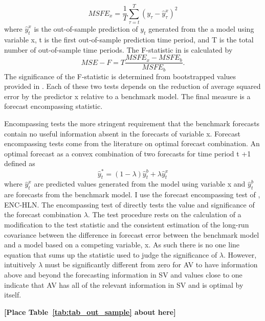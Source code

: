 \begin{equation} \label{eq:msfe}
	MSFE_{x} = \frac{1}{T} \sum_{\tau=t}^{T} (y_{\tau} - \hat{y}^{x}_{\tau})^{2}
\end{equation}
where $\hat{y}^{x}_{t}$ is the out-of-sample prediction of $y_{t}$ generated from the a model using variable x, t is the first out-of-sample prediction time period, and T is the total number of out-of-sample time periods. The F-statistic in \citet{mccracken_asymptotics_2007} is calculated by
\begin{equation} \label{eq:mse-f}
MSE-F = T \frac{MSFE_{x}-MSFE_{b}}{MSFE_{b}}.
\end{equation}
The significance of the F-statistic is determined from bootstrapped values provided in \citet{mccracken_asymptotics_2007}.
Each of these two tests depends on the reduction of average squared error by the predictor x relative to a benchmark model. The final measure is a forecast encompassing statistic. 

Encompassing tests the more stringent requirement that the benchmark forecasts contain no useful information absent in the forecasts of variable x. Forecast encompassing tests come from the literature on optimal forecast combination. \citep{Chong1986,Fair1990} An optimal forecast as a convex combination of two forecasts for time period t +1 defined as
\begin{equation} \label{eq:forecast_comb}
\hat y^{*}_{t} = (1-\lambda)\hat y^{b}_{t} + \lambda \hat y^{x}_{t}
\end{equation}
where $\hat y^{x}_{t}$ are predicted values generated from the model using variable x and $\hat y^{b}_{t}$ are forecasts from the benchmark model. I use the forecast encompassing test of \citet{harvey_tests_1998}, ENC-HLN.
The encompassing test of \citet{harvey_tests_1998} directly tests the value and significance of the forecast combination $\lambda$. The test procedure rests on the calculation of a modification to the \citet{Diebold1995} test statistic and the consistent estimation of the long-run covariance between the difference in forecast error between the benchmark model and a model based on a competing variable, x. As such there is no one line equation that sums up the statistic used to judge the significance of $\lambda$. However, intuitively $\lambda$ must be significantly different from zero for AV to have information above and beyond the forecasting information in SV and values close to one indicate that AV has all of the relevant information in SV and is optimal by itself.
\bigskip
\centerline{\bf [Place Table~\ref{tab:tab_out_sample} about here]}
\bigskip

